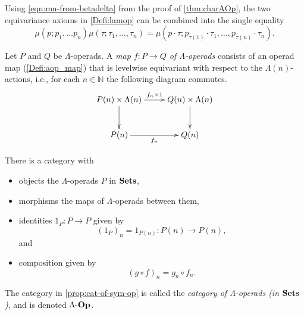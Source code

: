 \begin{rem}\label{rem:single-axiom}
Using \cref{eqn:mu-from-betadelta} from the proof of \cref{thm:charAOp}, the two equivariance axioms in \cref{Defi:lamop} can be combined into the single equality
\[
    \mu\left(p; p_1, \ldots p_n\right)  \mu\left(\tau;\tau_1, \ldots, \tau_n\right) = \mu\left(p \cdot \tau; p_{\tau(1)}\cdot \tau_{1}, \ldots,  p_{\tau(n)}\cdot \tau_{n}\right).
\]
\end{rem}


\begin{Defi}\label{Defi:aop_map}
Let $P$ and $Q$ be $\Lambda$-operads. A \emph{map $f \colon P \rightarrow Q$ of $\Lambda$-operads} consists of an operad map (\cref{Defi:aop_map}) that is levelwise equivariant with respect to the $\Lambda(n)$-actions, i.e., for each $n \in \mathbb{N}$ the following diagram commutes.
  \[
    \xy
      (0,0)*+{P(n) \times \Lambda(n)}="00";
      (30,0)*+{Q(n) \times \Lambda(n)}="10";
      (30,-15)*+{Q(n)}="11";
      (0,-15)*+{P(n)}="01";
      {\ar^{f_n \times 1} "00";"10"};
      {\ar "10";"11"};
      {\ar "00";"01"};
      {\ar_{f_n} "01";"11"};
    \endxy
  \]
\end{Defi}

\begin{prop}\label{prop:cat-of-L-op}
There is a category with 
\begin{itemize}
\item objects the $\Lambda$-operads $P$ in $\mathbf{Sets}$, 
\item morphisms the maps of $\Lambda$-operads between them,
\item identities $1_P \colon P \to P$ given by
\[
(1_P)_n = 1_{P(n)} \colon P(n) \to P(n),
\]
and
\item composition given by
\[
(g \circ f)_n = g_n \circ f_n.
\]
\end{itemize}
\end{prop}

\begin{nota}\label{nota:cat-of-L-op}
The category in \cref{prop:cat-of-sym-op} is called the \emph{category of $\Lambda$-operads (in $\mathbf{Sets}$)}, and is denoted $\Lambda\mbox{-}\mathbf{Op}$.
\end{nota}


